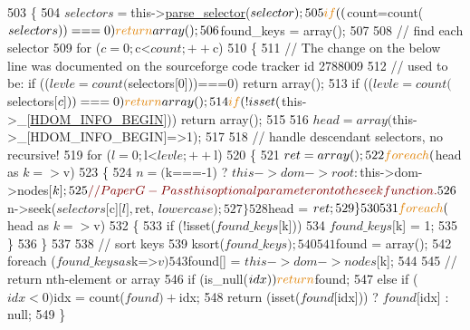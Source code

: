 \begin{DoxyCode}
503     \{
504         $selectors = $this->\hyperlink{classsimple__html__dom__node_a39d57c8087a0b463eeb942a1d8042013}{parse\_selector}($selector);
505         \textcolor{keywordflow}{if} (($count=count($selectors))===0) \textcolor{keywordflow}{return} array();
506         $found\_keys = array();
507 
508         \textcolor{comment}{// find each selector}
509         \textcolor{keywordflow}{for} ($c=0; $c<$count; ++$c)
510         \{
511             \textcolor{comment}{// The change on the below line was documented on the sourceforge code tracker id 2788009}
512             \textcolor{comment}{// used to be: if (($levle=count($selectors[0]))===0) return array();}
513             \textcolor{keywordflow}{if} (($levle=count($selectors[$c]))===0) \textcolor{keywordflow}{return} array();
514             \textcolor{keywordflow}{if} (!isset($this->\_[\hyperlink{simple__html__dom_8php_a05decffbdf780e841c1198d24aa889a1}{HDOM\_INFO\_BEGIN}])) \textcolor{keywordflow}{return} array();
515 
516             $head = array($this->\_[HDOM\_INFO\_BEGIN]=>1);
517 
518             \textcolor{comment}{// handle descendant selectors, no recursive!}
519             \textcolor{keywordflow}{for} ($l=0; $l<$levle; ++$l)
520             \{
521                 $ret = array();
522                 \textcolor{keywordflow}{foreach} ($head as $k=>$v)
523                 \{
524                     $n = ($k===-1) ? $this->dom->root : $this->dom->nodes[$k];
525                     \textcolor{comment}{//PaperG - Pass this optional parameter on to the seek function.}
526                     $n->seek($selectors[$c][$l], $ret, $lowercase);
527                 \}
528                 $head = $ret;
529             \}
530 
531             \textcolor{keywordflow}{foreach} ($head as $k=>$v)
532             \{
533                 \textcolor{keywordflow}{if} (!isset($found\_keys[$k]))
534                     $found\_keys[$k] = 1;
535             \}
536         \}
537 
538         \textcolor{comment}{// sort keys}
539         ksort($found\_keys);
540 
541         $found = array();
542         \textcolor{keywordflow}{foreach} ($found\_keys as $k=>$v)
543             $found[] = $this->dom->nodes[$k];
544 
545         \textcolor{comment}{// return nth-element or array}
546         \textcolor{keywordflow}{if} (is\_null($idx)) \textcolor{keywordflow}{return} $found;
547         \textcolor{keywordflow}{else} \textcolor{keywordflow}{if} ($idx<0) $idx = count($found) + $idx;
548         \textcolor{keywordflow}{return} (isset($found[$idx])) ? $found[$idx] : null;
549     \}
\end{DoxyCode}
\hypertarget{classsimple__html__dom__node_a03d7c0efb45d013cc1421612c719e867}{}

